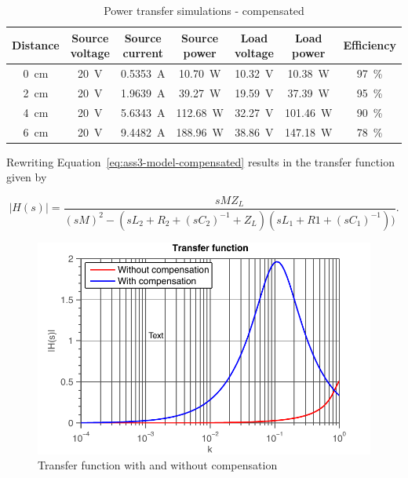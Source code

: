 \documentclass[11pt,titlepage]{report}
\begin{document}
\begin{table}[H]
	\centering
	\caption{Power transfer simulations - compensated}
	\label{tab:ass3-power-sim}
	\begin{tabular}{c c c c c c c}
		\hline\hline
		Distance & Source voltage & Source current & Source power & Load voltage & Load power & Efficiency \\
		\hline
		\SI{0}{cm} & \SI{20}{V} & \SI{0.5353}{A} & \SI{10.70}{W} & \SI{10.32}{V} & \SI{10.38}{W} & \SI{97}{\percent} \\
		\SI{2}{cm} & \SI{20}{V} & \SI{1.9639}{A} & \SI{39.27}{W} & \SI{19.59}{V} & \SI{37.39}{W} & \SI{95}{\percent} \\
		\SI{4}{cm} & \SI{20}{V} & \SI{5.6343}{A} & \SI{112.68}{W} & \SI{32.27}{V} & \SI{101.46}{W} & \SI{90}{\percent} \\
		\SI{6}{cm} & \SI{20}{V} & \SI{9.4482}{A} & \SI{188.96}{W} & \SI{38.86}{V} & \SI{147.18}{W} & \SI{78}{\percent} \\
		\hline
		\end{tabular}
\end{table}

Rewriting Equation~\ref{eq:ass3-model-compensated} results in the transfer function given by

\begin{equation} \label{eq:ass3-transfer-function}
	|H(s)| = \frac{s M Z_L}{(s M)^2 - (s L_2 + R_2 + (s C_2)^{-1} + Z_L) ( s L_1 + R1 + (s C_1)^{-1}))} .
\end{equation}

\begin{figure}[H]
	\begin{center}
		\includegraphics[width=0.8\linewidth]{resource/transfer-function-rc.pdf}
	\end{center}
	\caption{Transfer function with and without compensation}
	\label{fig:ass3-transfer-function}
\end{figure}
\end{document}
